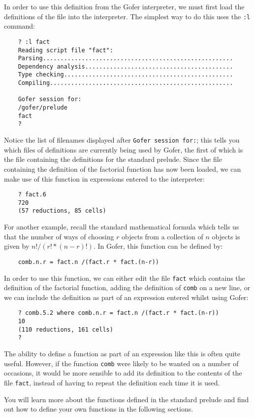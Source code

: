 In order to use this definition from the  Gofer  interpreter,  we  must
first load the definitions of  the  file  into  the  interpreter.   The
simplest way to do this uses the \verb":l" command:
\begin{verbatim}
    ? :l fact
    Reading script file "fact":
    Parsing......................................................
    Dependency analysis..........................................
    Type checking................................................
    Compiling....................................................

    Gofer session for:
    /gofer/prelude
    fact
    ?
\end{verbatim}
Notice the list of filenames displayed after \verb"Gofer session for:"; this
tells you which files of definitions are currently being used by Gofer,
the first of which is the  file  containing  the  definitions  for  the
standard prelude.  Since the file  containing  the  definition  of  the
factorial function has now  been  loaded,  we  can  make  use  of  this
function in expressions entered to the interpreter:
\begin{verbatim}
    ? fact.6
    720
    (57 reductions, 85 cells)
\end{verbatim}
For another example, recall the  standard  mathematical  formula  which
tells us that  the  number  of  ways  of  choosing  $r$  objects  from  a
collection of $n$ objects is given by $n! / (r! * (n-r)!)$.  In Gofer, this
function can be defined by:
\begin{verbatim}
    comb.n.r = fact.n /(fact.r * fact.(n-r))
\end{verbatim}
In order to use this function, we can either edit the file \verb"fact" which
contains  the  definition  of  the  factorial  function,   adding   the
definition of \verb"comb" on a new line, or we can include the definition as
part of an expression entered whilst using Gofer:
\begin{verbatim}    
    ? comb.5.2 where comb.n.r = fact.n /(fact.r * fact.(n-r))
    10
    (110 reductions, 161 cells)
    ? 
\end{verbatim}
The ability to define a function as part of an expression like this  is
often quite useful.  However, if the function \verb"comb" were likely to  be
wanted on a number of occasions, it would be more sensible to  add  its
definition to the contents of the file \verb"fact",  instead  of  having  to
repeat the definition each time it is used.

You will learn more about the functions defined in the standard prelude
and find out  how  to  define  your  own  functions  in  the  following
sections.

